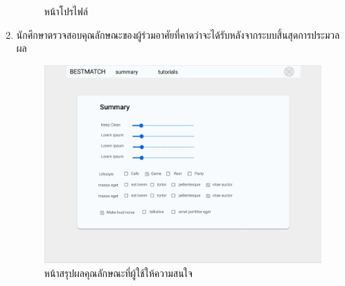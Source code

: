 \begin{enumerate}
\begin{figure}[ht]
\begin{center}
          \end{center}
          \caption{หน้าโปรไฟล์}
          \label{fig:profile}
        \end{figure}
        \clearpage
  \item นักศึกษาตรวจสอบคุณลักษณะของผู้ร่วมอาศัยที่คาดว่าจะได้รับหลังจากระบบสิ้นสุดการประมวลผล
        \begin{figure}[ht]
          \begin{center}
            \includegraphics[width=\linewidth]{photo/student/summary.png}
          \end{center}
          \caption{หน้าสรุปผลคุณลักษณะที่ผู้ใช้ให้ความสนใจ}
          \label{fig:summary}
        \end{figure}
\end{enumerate}

